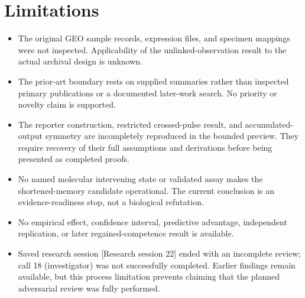 \documentclass[11pt]{article}
\begin{document}
\section{Limitations}
\begin{itemize}
\item The original GEO sample records, expression files, and specimen mappings were not inspected. Applicability of the unlinked-observation result to the actual archival design is unknown.
\item The prior-art boundary rests on supplied summaries rather than inspected primary publications or a documented later-work search. No priority or novelty claim is supported.
\item The reporter construction, restricted crossed-pulse result, and accumulated-output symmetry are incompletely reproduced in the bounded preview. They require recovery of their full assumptions and derivations before being presented as completed proofs.
\item No named molecular intervening state or validated assay makes the shortened-memory candidate operational. The current conclusion is an evidence-readiness stop, not a biological refutation.
\item No empirical effect, confidence interval, predictive advantage, independent replication, or later regained-competence result is available.
\item Saved research session [Research session 22] ended with an incomplete review; call 18 (investigator) was not successfully completed. Earlier findings remain available, but this process limitation prevents claiming that the planned adversarial review was fully performed.
\end{itemize}
\end{document}
